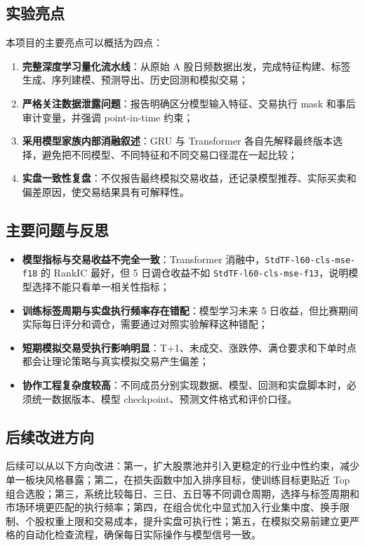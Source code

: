 \documentclass[12pt,a4paper,cn,bibtex]{elegantpaper}
\newcommand{\modelname}[1]{\nolinkurl{#1}}
\begin{document}
\subsection{实验亮点}
本项目的主要亮点可以概括为四点：
\begin{enumerate}[label=\arabic*)]
    \item \textbf{完整深度学习量化流水线}：从原始 A 股日频数据出发，完成特征构建、标签生成、序列建模、预测导出、历史回测和模拟交易；
    \item \textbf{严格关注数据泄露问题}：报告明确区分模型输入特征、交易执行 mask 和事后审计变量，并强调 point-in-time 约束；
    \item \textbf{采用模型家族内部消融叙述}：GRU 与 Transformer 各自先解释最终版本选择，避免把不同模型、不同特征和不同交易口径混在一起比较；
    \item \textbf{实盘一致性复盘}：不仅报告最终模拟交易收益，还记录模型推荐、实际买卖和偏差原因，使交易结果具有可解释性。
\end{enumerate}

\subsection{主要问题与反思}
\begin{itemize}
    \item \textbf{模型指标与交易收益不完全一致}：Transformer 消融中，\modelname{StdTF-l60-cls-mse-f18} 的 RankIC 最好，但 5 日调仓收益不如 \modelname{StdTF-l60-cls-mse-f13}，说明模型选择不能只看单一相关性指标；
    \item \textbf{训练标签周期与实盘执行频率存在错配}：模型学习未来 5 日收益，但比赛期间实际每日评分和调仓，需要通过对照实验解释这种错配；
    \item \textbf{短期模拟交易受执行影响明显}：T+1、未成交、涨跌停、满仓要求和下单时点都会让理论策略与真实模拟交易产生偏差；
    \item \textbf{协作工程复杂度较高}：不同成员分别实现数据、模型、回测和实盘脚本时，必须统一数据版本、模型 checkpoint、预测文件格式和评价口径。
\end{itemize}

\subsection{后续改进方向}
后续可以从以下方向改进：第一，扩大股票池并引入更稳定的行业中性约束，减少单一板块风格暴露；第二，在损失函数中加入排序目标，使训练目标更贴近 Top 组合选股；第三，系统比较每日、三日、五日等不同调仓周期，选择与标签周期和市场环境更匹配的执行频率；第四，在组合优化中显式加入行业集中度、换手限制、个股权重上限和交易成本，提升实盘可执行性；第五，在模拟交易前建立更严格的自动化检查流程，确保每日实际操作与模型信号一致。
\end{document}
